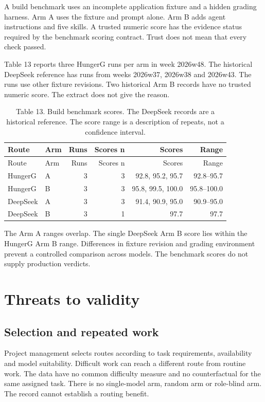 \documentclass[
  10pt,
  a4paper,
]{article}
\begin{document}
A build benchmark uses an incomplete application fixture and a hidden
grading harness. Arm A uses the fixture and prompt alone. Arm B adds
agent instructions and five skills. A trusted numeric score has the
evidence status required by the benchmark scoring contract. Trust does
not mean that every check passed.

Table 13 reports three HungerG runs per arm in week 2026w48. The
historical DeepSeek reference has runs from weeks 2026w37, 2026w38 and
2026w43. The runs use other fixture revisions. Two historical Arm B
records have no trusted numeric score. The extract does not give the
reason.

\begin{longtable}[]{@{}llrrrr@{}}
\caption{Table 13. Build benchmark scores. The DeepSeek records are a
historical reference. The score range is a description of repeats, not a
confidence interval.}\tabularnewline
\toprule\noalign{}
Route & Arm & Runs & Scores n & Scores & Range \\
\midrule\noalign{}
\endfirsthead
\toprule\noalign{}
Route & Arm & Runs & Scores n & Scores & Range \\
\midrule\noalign{}
\endhead
\bottomrule\noalign{}
\endlastfoot
HungerG & A & 3 & 3 & 92.8, 95.2, 95.7 & 92.8--95.7 \\
HungerG & B & 3 & 3 & 95.8, 99.5, 100.0 & 95.8--100.0 \\
DeepSeek & A & 3 & 3 & 91.4, 90.9, 95.0 & 90.9--95.0 \\
DeepSeek & B & 3 & 1 & 97.7 & 97.7 \\
\end{longtable}

The Arm A ranges overlap. The single DeepSeek Arm B score lies within
the HungerG Arm B range. Differences in fixture revision and grading
environment prevent a controlled comparison across models. The benchmark
scores do not supply production verdicts.

\section{Threats to validity}\label{threats-to-validity}

\subsection{Selection and repeated
work}\label{selection-and-repeated-work}

Project management selects routes according to task requirements,
availability and model suitability. Difficult work can reach a different
route from routine work. The data have no common difficulty measure and
no counterfactual for the same assigned task. There is no single-model
arm, random arm or role-blind arm. The record cannot establish a routing
benefit.
\end{document}
